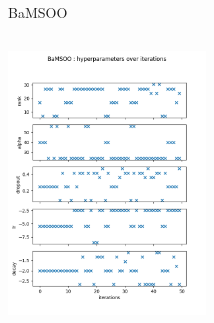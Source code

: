 \begin{frame}[allowframebreaks]{BaMSOO}
\begin{columns}
        \begin{column}{0.4\textwidth}
            \includegraphics[height = 7cm]{imgs/plots/exp11_variables_over_time.png}
            
            
        \end{column}
    \end{columns}  
\end{frame}

